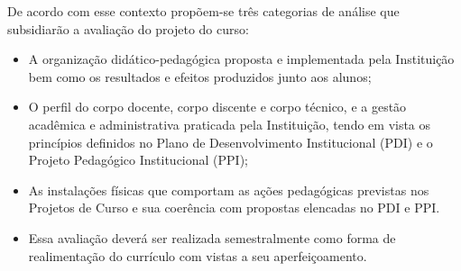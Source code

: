 De acordo com esse contexto propõem-se três categorias de análise que subsidiarão a avaliação do projeto do curso:
\begin{itemize}
	\item A organização didático-pedagógica proposta e implementada pela Instituição bem como os resultados e efeitos produzidos junto aos alunos;
	\item O perfil do corpo docente, corpo discente e corpo técnico, e a gestão acadêmica e administrativa praticada pela Instituição, tendo em vista os princípios definidos no Plano de Desenvolvimento Institucional (PDI) e o Projeto Pedagógico Institucional (PPI);
	\item As instalações físicas que comportam as ações pedagógicas previstas nos Projetos de Curso e sua coerência com propostas elencadas no PDI e PPI.
	\item Essa avaliação deverá ser realizada semestralmente como forma de realimentação do currículo com vistas a seu aperfeiçoamento.
\end{itemize}



